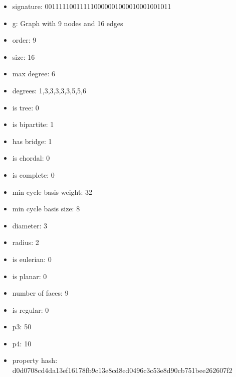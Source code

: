 \newpage
\begin{figure}
\end{figure}
\begin{itemize}
\item signature: 001111100111110000001000010001001011
\item g: Graph with 9 nodes and 16 edges
\item order: 9
\item size: 16
\item max degree: 6
\item degrees: 1,3,3,3,3,3,5,5,6
\item is tree: 0
\item is bipartite: 1
\item has bridge: 1
\item is chordal: 0
\item is complete: 0
\item min cycle basis weight: 32
\item min cycle basis size: 8
\item diameter: 3
\item radius: 2
\item is eulerian: 0
\item is planar: 0
\item number of faces: 9
\item is regular: 0
\item p3: 50
\item p4: 10
\item property hash: d0d0708cd4da13ef16178fb9c13e8cd8ed0496c3c53e8d90cb751bee262607f2
\end{itemize}
